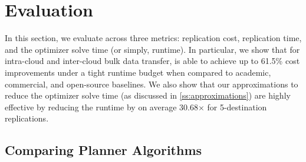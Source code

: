 \section{Evaluation}




In this section, we evaluate \sys{} across three metrics: replication cost, replication time, and the optimizer solve time (or simply, runtime).
% 
In particular, we show that for intra-cloud and inter-cloud bulk data transfer, \sys{} is able to achieve up to 61.5\% cost improvements under a tight runtime budget when compared to academic, commercial, and open-source baselines.
% 
We also show that our approximations to reduce the optimizer solve time (as discussed in \cref{ss:approximations}) are highly effective by reducing the runtime by on average 30.68$\times$ for 5-destination replications.


\subsection{Comparing Planner Algorithms} \label{sec:algorithm_eval}

